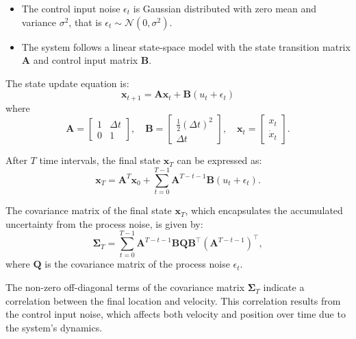 \documentclass[answers]{exam}
\begin{document}
\begin{questions}
\begin{parts}
\begin{solution}
            \begin{itemize}
                \item The control input noise \( \epsilon_t \) is Gaussian distributed with zero mean and variance \( \sigma^2 \), that is \( \epsilon_t \sim \mathcal{N}(0, \sigma^2) \).
                \item The system follows a linear state-space model with the state transition matrix \( \mathbf{A} \) and control input matrix \( \mathbf{B} \).
            \end{itemize}
            
            The state update equation is:
            \[ \mathbf{x}_{t+1} = \mathbf{A} \mathbf{x}_t + \mathbf{B} (u_t + \epsilon_t) \]
            where
            \[ \mathbf{A} = \begin{bmatrix} 1 & \Delta t \\ 0 & 1 \end{bmatrix}, \quad \mathbf{B} = \begin{bmatrix} \frac{1}{2} (\Delta t)^2 \\ \Delta t \end{bmatrix}, \quad \mathbf{x}_t = \begin{bmatrix} x_t \\ \dot{x}_t \end{bmatrix}. \]
            
            After \( T \) time intervals, the final state \( \mathbf{x}_T \) can be expressed as:
            \[ \mathbf{x}_T = \mathbf{A}^T \mathbf{x}_0 + \sum_{t=0}^{T-1} \mathbf{A}^{T-t-1} \mathbf{B} (u_t + \epsilon_t). \]
            
            The covariance matrix of the final state \( \mathbf{x}_T \), which encapsulates the accumulated uncertainty from the process noise, is given by:
            \[ \mathbf{\Sigma}_T = \sum_{t=0}^{T-1} \mathbf{A}^{T-t-1} \mathbf{B} \mathbf{Q} \mathbf{B}^\top (\mathbf{A}^{T-t-1})^\top, \]
            where \( \mathbf{Q} \) is the covariance matrix of the process noise \( \epsilon_t \).
            
            The non-zero off-diagonal terms of the covariance matrix \( \mathbf{\Sigma}_T \) indicate a correlation between the final location and velocity. This correlation results from the control input noise, which affects both velocity and position over time due to the system's dynamics.
        \end{solution}
                   
    \end{parts}


\end{questions}
\end{document}
